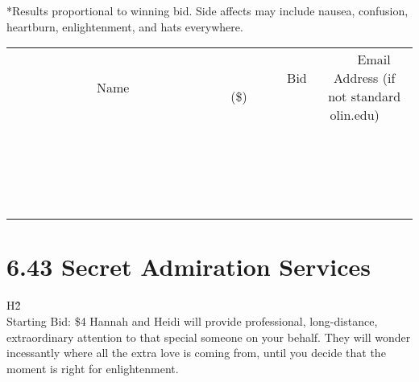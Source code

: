\documentclass[11pt]{article}
\begin{document}
*Results proportional to winning bid. Side affects may include nausea, confusion, heartburn, enlightenment, and hats everywhere.
\\[3ex]
\begin{tabular}{c c c}
~~~~~~~~~~~~~Name~~~~~~~~~~~~~ & ~~~~~~~~~Bid (\$)~~~~~~~~~  & ~~~Email Address (if not standard olin.edu)~~~\\
 & & \\
\hline
 & & \\
\hline
 & & \\
\hline
 & & \\
\hline
 & & \\
\hline
 & & \\
\hline
 & & \\
\hline
 & & \\
\hline
 & & \\
\hline
 & & \\
\hline
 & & \\
\hline
 & & \\
\hline
 & & \\
\hline
 & & \\
\hline
 & & \\
\hline
 & & \\
\hline
 & & \\
\hline
 & & \\
\hline
 & & \\
\hline
\end{tabular}
\newpage
\section*{6.43 Secret Admiration Services}
H\^2
\\
Starting Bid: \$4
\newline
Hannah and Heidi will provide professional, long-distance, extraordinary attention to that special someone on your behalf. They will wonder incessantly where all the extra love is coming from, until you decide that the moment is right for enlightenment. 
\end{document}
